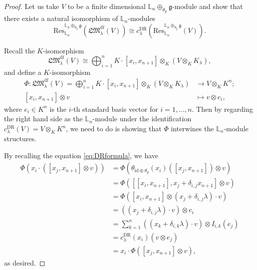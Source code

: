 \documentclass[a4paper,12pt]{article}
\theoremstyle{definition}
\theoremstyle{remark}
\begin{document}
\begin{proof}
Let us take $V$ to be a finite dimensional $\mathbb{L}_{n}\oplus_{\theta_{g}}\mathfrak{g}$-module
and show that there exists a natural isomorphism of $\mathbb{L}_{n}$-modules
\[
	\mathrm{Res}_{\mathbb{L}_{n}}^{\mathbb{L}_{n}\oplus_{\theta_{g}}\mathfrak{g}}(\mathfrak{LM}^{\mathrm{df}}_{\lambda}(V))
	\cong c^{\mathrm{DR}}_{\lambda}(\mathrm{Res}_{\mathbb{L}_{n}}^{\mathbb{L}_{n}\oplus_{\theta_{g}}\mathfrak{g}}(V)).
\]

Recall the $K$-isomorphism
\[
	\mathfrak{LM}_{\lambda}^{\mathrm{df}}(V)\cong \bigoplus_{i=1}^{n} K\cdot [x_{i},x_{n+1}]\otimes_{K} (V\otimes_{K}K_{\lambda}),
\]
and define a $K$-isomorphism
\begin{align*}
	\Phi\colon \mathfrak{LM}_{\lambda}^{\mathrm{df}}(V)= 
	\bigoplus_{i=1}^{n} K\cdot [x_{i},x_{n+1}]\otimes_{K} (V\otimes_{K}K_{\lambda})
	&\longrightarrow V\otimes_{K} K^{n};\\
	[x_{i},x_{n+1}]\otimes v&\longmapsto v\otimes e_{i},
\end{align*}
where $e_{i}\in K^{n}$ is the $i$-th standard basis vector for $i=1,\ldots,n$.
Then by regarding  the right hand side as the $\mathbb{L}_{n}$-module under the identification
$c^{\mathrm{DR}}_{\lambda}(V)=V\otimes_{K}K^{n}$,
we need to do is showing  that $\Phi$ interwines the $\mathbb{L}_{n}$-module structures.

By recalling the equation \eqref{eq:DRformula},
we have
\begin{align*}
	\Phi(x_{i}\cdot ([x_{j},x_{n+1}]\otimes v))&=
	\Phi(\theta_{\mathrm{id}\oplus \theta_{g}}(x_{i})([x_{j},x_{n+1}])\otimes v)\\
	&=\Phi([[x_{i},x_{n+1}],x_{j}+\delta_{i,j}x_{n+1}]\otimes v)\\
	&=\Phi([x_{i},x_{n+1}]\otimes (x_{j}+\delta_{i,j}\lambda)\cdot v)\\
	&=((x_{j}+\delta_{i,j}\lambda)\cdot v)\otimes e_{i}\\
	&=\sum_{k=1}^{n} ((x_{k}+\delta_{i,k}\lambda)\cdot v)\otimes I_{i,k}(e_{j})\\
	&=c^{\mathrm{DR}}_{\lambda}(x_{i})(v\otimes e_{j})\\
	&=x_{i}\cdot \Phi([x_{j},x_{n+1}]\otimes v),
\end{align*}
as desired.	
\end{proof}
\end{document}
